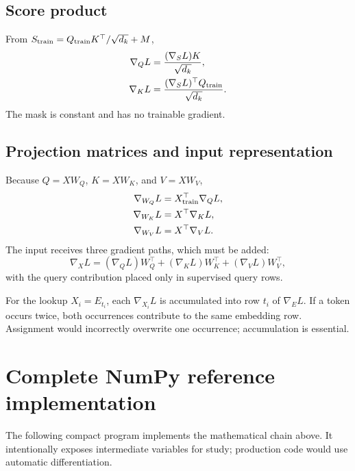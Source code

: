\documentclass[11pt]{article}
\newcommand{\grad}{\nabla}
\begin{document}
\subsection{Score product}

From $S_{\rm train}=Q_{\rm train}K^\top/\sqrt{d_k}+M$,
\begin{align}
  \grad_Q L&=\frac{(\grad_S L)K}{\sqrt{d_k}},\\
  \grad_K L&=\frac{(\grad_S L)^\top Q_{\rm train}}{\sqrt{d_k}}.
\end{align}
The mask is constant and has no trainable gradient.

\subsection{Projection matrices and input representation}

Because $Q=XW_Q$, $K=XW_K$, and $V=XW_V$,
\begin{align}
  \grad_{W_Q}L&=X_{\rm train}^\top\grad_Q L,\\
  \grad_{W_K}L&=X^\top\grad_K L,\\
  \grad_{W_V}L&=X^\top\grad_V L.
\end{align}
The input receives three gradient paths, which must be added:
\begin{equation}
  \grad_XL=(\grad_Q L)W_Q^\top+(\grad_K L)W_K^\top+(\grad_V L)W_V^\top,
\end{equation}
with the query contribution placed only in supervised query rows.

For the lookup $X_i=E_{t_i}$, each $\grad_{X_i}L$ is accumulated into row $t_i$ of $\grad_E L$.
If a token occurs twice, both occurrences contribute to the same embedding row. Assignment would incorrectly
overwrite one occurrence; accumulation is essential.

\section{Complete NumPy reference implementation}

The following compact program implements the mathematical chain above. It intentionally exposes intermediate
variables for study; production code would use automatic differentiation.
\end{document}
